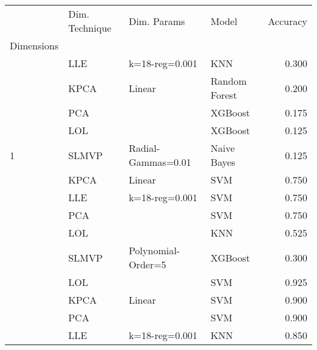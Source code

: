 \begin{table}
    \begin{tabular}{llllr}
        \toprule
        {}                                       & Dim. Technique & Dim. Params        & Model         & Accuracy \\
        Dimensions                               &                &                    &               &          \\
        \midrule
                                                 & LLE            & k=18-reg=0.001     & KNN           & 0.300    \\
                                                 & KPCA           & Linear             & Random Forest & 0.200    \\
                                                 & PCA            &                    & XGBoost       & 0.175    \\
                                                 & LOL            &                    & XGBoost       & 0.125    \\
        \multirow{-3}{*}{1}                      & SLMVP          & Radial-Gammas=0.01 & Naive Bayes   & 0.125    \\
        \rowcolor{lightgray}                     & KPCA           & Linear             & SVM           & 0.750    \\
        \rowcolor{lightgray}                     & LLE            & k=18-reg=0.001     & SVM           & 0.750    \\
        \rowcolor{lightgray}                     & PCA            &                    & SVM           & 0.750    \\
        \rowcolor{lightgray}                     & LOL            &                    & KNN           & 0.525    \\
        \rowcolor{lightgray}\multirow{-3}{*}{3}  & SLMVP          & Polynomial-Order=5 & XGBoost       & 0.300    \\
                                                 & LOL            &                    & SVM           & 0.925    \\
                                                 & KPCA           & Linear             & SVM           & 0.900    \\
                                                 & PCA            &                    & SVM           & 0.900    \\
                                                 & LLE            & k=18-reg=0.001     & KNN           & 0.850    \\

\end{tabular}
\end{table}
